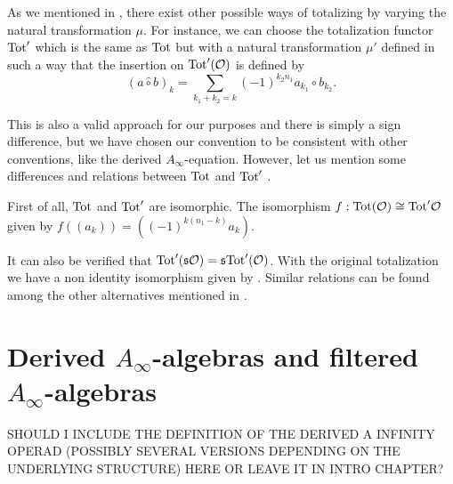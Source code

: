 \documentclass[twoside]{article}
\begin{document}
\begin{remark}\label{othermu}


As we mentioned in , there exist other possible ways of totalizing by varying the natural transformation $\mu$. For instance, we can choose the totalization functor $\mathrm{Tot}'$ which is the same as $\mathrm{Tot}$ but with a natural transformation $\mu'$ defined in such a way that the insertion on $\mathrm{Tot}'({\mathcal O})$ is defined by \[(a\hat{\circ}b)_k=\sum_{k_1+k_2=k}(-1)^{k_2n_1}a_{k_1}\circ b_{k_2}.\] 

This is also a valid approach for our purposes and there is simply a sign difference, but we have chosen our convention to be consistent with other conventions, like the derived $A_\infty$-equation. However, let us mention some differences and relations between $\mathrm{Tot}$ and $\mathrm{Tot}'$ . %

First of all, $\mathrm{Tot}$ and $\mathrm{Tot}'$ are isomorphic. The isomorphism $f:\mathrm{Tot}({\mathcal O})\cong \mathrm{Tot}'{\mathcal O}$ given by $f((a_k))=((-1)^{k(n_1-k)}a_k)$. %

It can also be verified that $\mathrm{Tot}'(\mathfrak{s}{\mathcal O})=\mathfrak{s} \mathrm{Tot}'({\mathcal O})$. With the original totalization we have a non identity isomorphism given by . Similar relations can be found among the other alternatives mentioned in . %



\end{remark}





\section{Derived $A_\infty$-algebras and filtered $A_\infty$-algebras}
SHOULD I INCLUDE THE DEFINITION OF THE DERIVED A INFINITY OPERAD (POSSIBLY SEVERAL VERSIONS DEPENDING ON THE UNDERLYING STRUCTURE) HERE OR LEAVE IT IN INTRO CHAPTER?
\end{document}
